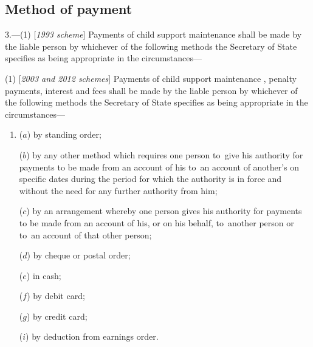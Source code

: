 \documentclass[12pt,a4paper]{article}
\begin{document}

\subsection[3. Method of payment]{Method of payment}

3.—(1) [\emph{1993 scheme}] Payments of child support maintenance shall be made by the liable person by whichever of the following methods the Secretary of State specifies as being appropriate in the circumstances—

(1) [\emph{2003 and 2012 schemes}] Payments of child support maintenance%
, penalty payments, interest and fees  %
shall be made by the liable person by whichever of the following methods the Secretary of State specifies as being appropriate in the circumstances—
\begin{enumerate}\item[]
($a$) by standing order;

($b$) by any other method which requires one person to~give his authority for payments to be made from an account of his to~an account of another’s on specific dates during the period for which the authority is in force and without the need for any further authority from him;

($c$) by an arrangement whereby one person gives his authority for payments to be made from an account of his, or on his behalf, to~another person or to~an account of that other person;

($d$) by cheque or postal order;

($e$) in cash;

($f$) by debit card;

($g$) by credit card;


($i$) by deduction from earnings order.
\end{enumerate}
\end{document}
